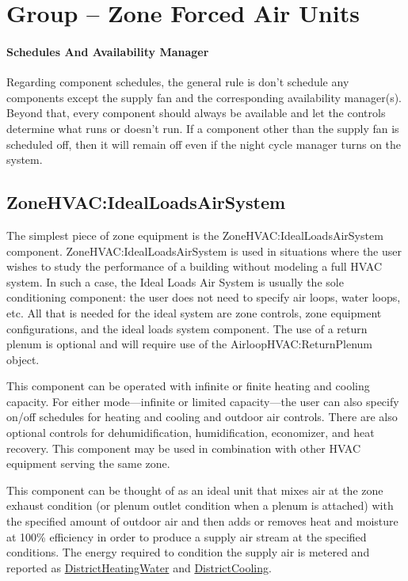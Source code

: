 \section{Group -- Zone Forced Air Units}\label{group-zone-forced-air-units}

\paragraph{Schedules And Availability Manager}\label{schedules-and-availability-manager}
Regarding component schedules, the general rule is don't schedule any components except the supply fan and the corresponding availability manager(s). Beyond that, every component should always be available and let the controls determine what runs or doesn't run. If a component other than the supply fan is scheduled off, then it will remain off even if the night cycle manager turns on the system.

\subsection{ZoneHVAC:IdealLoadsAirSystem}\label{zonehvacidealloadsairsystem}

The simplest piece of zone equipment is the ZoneHVAC:IdealLoadsAirSystem component. ZoneHVAC:IdealLoadsAirSystem is used in situations where the user wishes to study the performance of a building without modeling a full HVAC system. In such a case, the Ideal Loads Air System is usually the sole conditioning component: the user does not need to specify air loops, water loops, etc. All that is needed for the ideal system are zone controls, zone equipment configurations, and the ideal loads system component. The use of a return plenum is optional and will require use of the AirloopHVAC:ReturnPlenum object.

This component can be operated with infinite or finite heating and cooling capacity. For either mode---infinite or limited capacity---the user can also specify on/off schedules for heating and cooling and outdoor air controls. There are also optional controls for dehumidification, humidification, economizer, and heat recovery. This component may be used in combination with other HVAC equipment serving the same zone.

This component can be thought of as an ideal unit that mixes air at the zone exhaust condition (or plenum outlet condition when a plenum is attached) with the specified amount of outdoor air and then adds or removes heat and moisture at 100\% efficiency in order to produce a supply air stream at the specified conditions. The energy required to condition the supply air is metered and reported as \hyperref[districtheating]{DistrictHeatingWater} and \hyperref[districtcooling]{DistrictCooling}.

